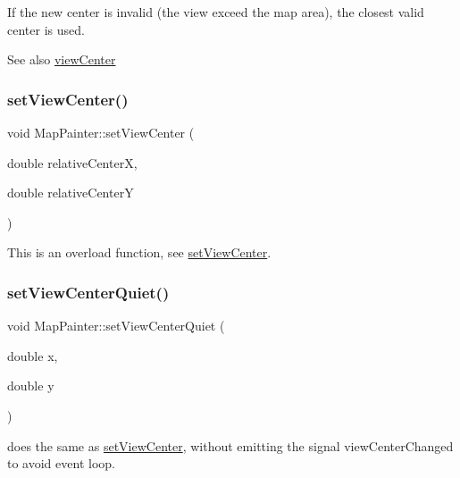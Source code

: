 If the new center is invalid (the view exceed the map area), the closest valid center is used.

\begin{DoxySeeAlso}{See also}
\hyperlink{class_map_painter_a268279c396ea9502059bf1901f0c686c}{view\+Center} 
\end{DoxySeeAlso}
\hypertarget{class_map_painter_ae840a2addecd404598ec8300bbd4870f}{}\label{class_map_painter_ae840a2addecd404598ec8300bbd4870f} 
\subsubsection{\texorpdfstring{set\+View\+Center()}{setViewCenter()}\hspace{0.1cm}{\footnotesize\ttfamily [2/2]}}
{\footnotesize\ttfamily void Map\+Painter\+::set\+View\+Center (\begin{DoxyParamCaption}\item[{double}]{relative\+CenterX,  }\item[{double}]{relative\+CenterY }\end{DoxyParamCaption})}

This is an overload function, see \hyperlink{class_map_painter_a435c535da8087a54ba09c71232377508}{set\+View\+Center}. \hypertarget{class_map_painter_a5da86b2c104c9d22eb54ecd7b1d0b960}{}\label{class_map_painter_a5da86b2c104c9d22eb54ecd7b1d0b960} 
\subsubsection{\texorpdfstring{set\+View\+Center\+Quiet()}{setViewCenterQuiet()}}
{\footnotesize\ttfamily void Map\+Painter\+::set\+View\+Center\+Quiet (\begin{DoxyParamCaption}\item[{double}]{x,  }\item[{double}]{y }\end{DoxyParamCaption})}

does the same as \hyperlink{class_map_painter_a435c535da8087a54ba09c71232377508}{set\+View\+Center}, without emitting the signal view\+Center\+Changed to avoid event loop. \hypertarget{class_map_painter_aeec29e22231c125bb8df15288082dd50}{}\label{class_map_painter_aeec29e22231c125bb8df15288082dd50} 
